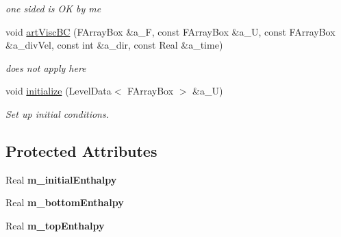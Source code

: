 \begin{DoxyCompactItemize}
\begin{DoxyCompactList}\small\item\em one sided is O\-K by me \end{DoxyCompactList}\item 
\hypertarget{class_advect_heat_i_b_c_aec3ed7a0097e90aa5eed59ba965d9766}{void \hyperlink{class_advect_heat_i_b_c_aec3ed7a0097e90aa5eed59ba965d9766}{art\-Visc\-B\-C} (F\-Array\-Box \&a\-\_\-\-F, const F\-Array\-Box \&a\-\_\-\-U, const F\-Array\-Box \&a\-\_\-div\-Vel, const int \&a\-\_\-dir, const Real \&a\-\_\-time)}\label{class_advect_heat_i_b_c_aec3ed7a0097e90aa5eed59ba965d9766}

\begin{DoxyCompactList}\small\item\em does not apply here \end{DoxyCompactList}\item 
\hypertarget{class_advect_heat_i_b_c_ac26c3f4f07efbf9ae0a29f784f67decb}{void \hyperlink{class_advect_heat_i_b_c_ac26c3f4f07efbf9ae0a29f784f67decb}{initialize} (Level\-Data$<$ F\-Array\-Box $>$ \&a\-\_\-\-U)}\label{class_advect_heat_i_b_c_ac26c3f4f07efbf9ae0a29f784f67decb}

\begin{DoxyCompactList}\small\item\em Set up initial conditions. \end{DoxyCompactList}\end{DoxyCompactItemize}
\subsection*{Protected Attributes}
\begin{DoxyCompactItemize}
\item 
\hypertarget{class_advect_heat_i_b_c_adad76c0108549d04ae1923d9777f84dc}{Real {\bfseries m\-\_\-initial\-Enthalpy}}\label{class_advect_heat_i_b_c_adad76c0108549d04ae1923d9777f84dc}

\item 
\hypertarget{class_advect_heat_i_b_c_a77f6189820805351c6136c0d0b50b14e}{Real {\bfseries m\-\_\-bottom\-Enthalpy}}\label{class_advect_heat_i_b_c_a77f6189820805351c6136c0d0b50b14e}

\item 
\hypertarget{class_advect_heat_i_b_c_a17f3c3b33f6af0508859f4ba38d3f701}{Real {\bfseries m\-\_\-top\-Enthalpy}}\label{class_advect_heat_i_b_c_a17f3c3b33f6af0508859f4ba38d3f701}

\end{DoxyCompactItemize}


